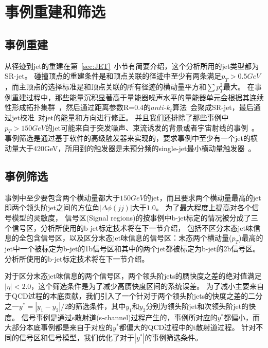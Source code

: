 \section{事例重建和筛选}
\label{sec:DijetSelection}



\subsection{事例重建}
\label{sec:DijetSelection1}
从径迹到jet的重建在第~\ref{sec:JET}~小节有简要介绍，这个分析所用的jet类型都为SR-jet。
碰撞顶点的重建条件是和顶点关联的径迹中至少有两条满足$p_{T}>0.5GeV$，而主顶点的选择标准是和顶点关联的所有径迹的横动量平方和$\sum p^2_{T}$最大。
在事例重建过程中，那些能量沉积显著高于量能器噪声水平的量能器单元会根据其连续性形成拓扑集群~\cite{PERF-2014-07}，然后通过距离参数R=0.4的$anti$-$k_{t}$算法~\cite{Cacciari:2008gp, Fastjet}会聚成SR-jet，最后通过jet校准~\cite{PERF-2016-04}对jet的能量和方向进行修正。
并且我们还排除了那些事例中$p_{T}>150GeV$的jet可能来自于突发噪声、束流诱发的背景或者宇宙射线的事例~\cite{ATLAS-CONF-2015-029}。
事例筛选是通过基于软件的高级触发器来实现的，要求事例中至少有一个jet的横动量大于420GeV，所用到的触发器是未预分频的single-jet最小横动量触发器~\cite{ATLASRTS}。


\subsection{事例筛选}
\label{sec:DijetSelection2}
事例中至少要包含两个横动量都大于$150GeV$的jet，而且要求两个横动量最高的jet即两个领头阶jet之间的方位角$|\Delta \phi(jj)|$大于$1.0$。
为了最大程度上提高对各个信号模型的灵敏度，
信号区(Signal regions)的按事例中b-jet标定的情况被分成了三个信号区，分析所使用的b-jet标定技术将在下一节介绍，
包括不区分末态jet味信息的全包含信号区，以及区分末态jet味信息的信号区：末态两个横动量($p_{T}$)最高的jet中一个被标定为b-jet的1b信号区和其中的两个jet都被标定为b-jet的2b信号区。
分析所使用的b-jet标定技术将在下一节介绍。

对于区分末态jet味信息的两个信号区，两个领头阶jets的赝快度之差的绝对值满足$|\eta|<2.0$，这个筛选条件是为了减少高赝快度区间的系统误差。
为了减小主要来自于QCD过程的本底贡献，我们引入了一个针对于两个领头阶jets的快度之差的二分之一$y^*=|y_1-y_2|/2$的筛选条件，其中$y_1$和$y_2$分别为领头阶jet和次领头阶jet的快度。
信号事例是通过s散射道(s-channel)过程产生的，事例所对应的$y^*$都偏小，而大部分本底事例都是来自于对应的$y^*$都偏大的QCD过程中的t散射道过程。
针对不同的信号区和信号模型，我们优化了对于$|y^*|$的事例筛选条件。

